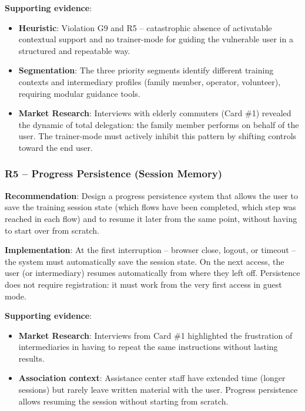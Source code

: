 ﻿\documentclass[11pt,a4paper]{article}
\begin{document}
\textbf{Supporting evidence}:
\begin{itemize}
    \item \textbf{Heuristic}: Violation G9 and R5 -- catastrophic absence of
    activatable contextual support and no trainer-mode for guiding
    the vulnerable user in a structured and repeatable way.
    \item \textbf{Segmentation}: The three priority segments identify
    different training contexts and intermediary profiles (family member,
    operator, volunteer), requiring modular guidance tools.
    \item \textbf{Market Research}: Interviews with elderly commuters
    (Card \#1) revealed the dynamic of total delegation: the family member
    performs on behalf of the user. The trainer-mode must actively inhibit
    this pattern by shifting controls toward the end user.
\end{itemize}

\subsubsection{R5 -- Progress Persistence (Session Memory)}
\label{rec:R5}

\textbf{Recommendation}: Design a progress persistence system
that allows the user to save the training session state (which
flows have been completed, which step was reached in each flow)
and to resume it later from the same point, without having to start
over from scratch.

\textbf{Implementation}: At the first interruption -- browser close,
logout, or timeout -- the system must automatically save the session
state. On the next access, the user (or intermediary) resumes
automatically from where they left off. Persistence does not require
registration: it must work from the very first access in guest mode.

\textbf{Supporting evidence}:
\begin{itemize}
    \item \textbf{Market Research}: Interviews from Card \#1
    highlighted the frustration of intermediaries in having to repeat
    the same instructions without lasting results.
    \item \textbf{Association context}: Assistance center staff have extended time
    (longer sessions) but rarely leave written material with the user.
    Progress persistence allows resuming the session without starting from scratch.
\end{itemize}
\end{document}
